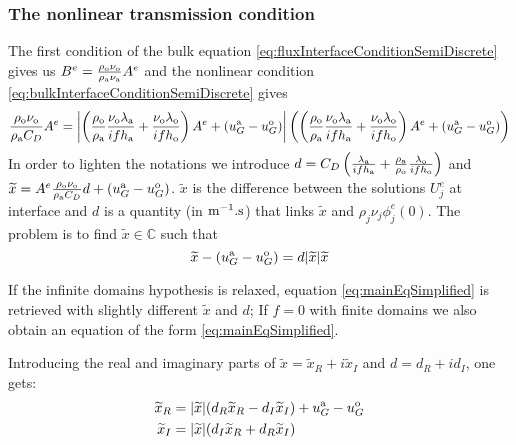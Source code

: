 \subsubsection{The nonlinear transmission condition}
\label{sec:OASchwarz_SteadyStateNonlinear}
The first condition of the bulk equation
\eqref{eq:fluxInterfaceConditionSemiDiscrete} gives us
$B^e = \frac{\rho_{\rm o} \nu_{\rm o}}{\rho_{\rm a} \nu_{\rm a} } A^e$
and the nonlinear condition
\eqref{eq:bulkInterfaceConditionSemiDiscrete} gives
\begin{equation} \label{eq:stationaryBulkFirstEq}
    \frac{\rho_{\rm o} \nu_{\rm o}}{\rho_{\rm a} C_D} A^e
    =
    \left|
    \left(
    \frac{\rho_{\rm o}}{\rho_{\rm a}}\frac{\nu_{\rm o}\lambda_{\rm a}}{if h_{\rm a}} 
    +\frac{\nu_{\rm o}\lambda_{\rm o}}{if h_{\rm o}} \right) A^e
    + (u_G^{\rm a} - u_G^{\rm o})
    \right|
    \left(
    \left(
    \frac{\rho_{\rm o}}{\rho_{\rm a}}\frac{\nu_{\rm o}\lambda_{\rm a}}{if h_{\rm a}} 
    +\frac{\nu_{\rm o}\lambda_{\rm o}}{if h_{\rm o}} \right) A^e
    + (u_G^{\rm a} - u_G^{\rm o})
    \right)
\end{equation}
In order to lighten the notations we introduce $d = C_D \left(
    \frac{\lambda_{\rm a}}{if h_{\rm a}} 
    +\frac{\rho_{\rm a}}{\rho_{\rm o}}\frac{\lambda_{\rm o}}{if h_{\rm o}} \right)$ and
$\widetilde{x} = A^e \frac{\rho_{\rm o} \nu_{\rm o}}{\rho_{\rm a} C_D}d+\left(u_G^{\rm a} - u_G^{\rm o}\right)$.
$\widetilde{x}$ is the difference between the
solutions ${U}^e_j$ at interface
and $d$ is a quantity (in ${\rm m}^{-1}.{\rm s}$) that links
$\widetilde{x}$ and $\rho_j \nu_j {\phi}^e_j(0)$.
The problem is to find $\widetilde{x}\in \mathbb{C}$ such that
\begin{equation} \label{eq:mainEqSimplified}
    \widetilde{x} - \left(u_G^{\rm a} - u_G^{\rm o}\right) = d|\widetilde{x}|\widetilde{x}
\end{equation}
\begin{remark}
If the infinite domains hypothesis is relaxed, equation \eqref{eq:mainEqSimplified} is retrieved with slightly different $\widetilde{x}$ and $d$;
If $f=0$ with finite domains we also obtain an equation of
the form \eqref{eq:mainEqSimplified}.
\end{remark}
Introducing the real and imaginary parts of
$\widetilde{x}=\widetilde{x}_R+i{\widetilde{x}_I}$ and
$d={d_R}+i{d_I}$, one gets:
\begin{equation}
    \begin{aligned}
    \widetilde{x}_R &= |\widetilde{x}|({d_R} \widetilde{x}_R - {d_I}{\widetilde{x}_I}) +u_G^{\rm a} - u_G^{\rm o} \\
    {\widetilde{x}_I} &= |\widetilde{x}|({d_I}\widetilde{x}_R + {d_R}{\widetilde{x}_I})
    \end{aligned}
\end{equation}
